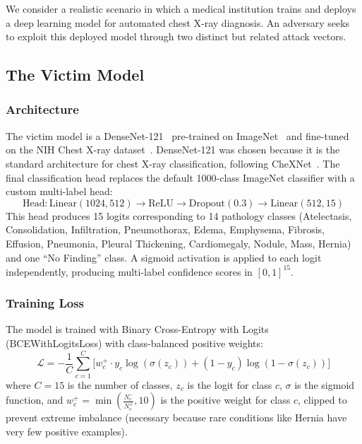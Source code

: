 \documentclass[conference]{IEEEtran}
\begin{document}
We consider a realistic scenario in which a medical institution trains and deploys a deep learning model for automated chest X-ray diagnosis. An adversary seeks to exploit this deployed model through two distinct but related attack vectors.

\subsection{The Victim Model}

\subsubsection{Architecture}
The victim model is a DenseNet-121~\cite{huang2017densely} pre-trained on ImageNet~\cite{deng2009imagenet} and fine-tuned on the NIH Chest X-ray dataset~\cite{wang2017chestxray}. DenseNet-121 was chosen because it is the standard architecture for chest X-ray classification, following CheXNet~\cite{rajpurkar2017chexnet}. The final classification head replaces the default 1000-class ImageNet classifier with a custom multi-label head:
\begin{equation}
    \text{Head}: \text{Linear}(1024, 512) \rightarrow \text{ReLU} \rightarrow \text{Dropout}(0.3) \rightarrow \text{Linear}(512, 15)
\end{equation}
This head produces 15 logits corresponding to 14 pathology classes (Atelectasis, Consolidation, Infiltration, Pneumothorax, Edema, Emphysema, Fibrosis, Effusion, Pneumonia, Pleural Thickening, Cardiomegaly, Nodule, Mass, Hernia) and one ``No Finding'' class. A sigmoid activation is applied to each logit independently, producing multi-label confidence scores in $[0, 1]^{15}$.

\subsubsection{Training Loss}
The model is trained with Binary Cross-Entropy with Logits (BCEWithLogitsLoss) with class-balanced positive weights:
\begin{equation}
    \mathcal{L} = -\frac{1}{C} \sum_{c=1}^{C} \Big[ w_c^+ \cdot y_c \log(\sigma(z_c)) + (1 - y_c) \log(1 - \sigma(z_c)) \Big]
\end{equation}
where $C = 15$ is the number of classes, $z_c$ is the logit for class $c$, $\sigma$ is the sigmoid function, and $w_c^+ = \min\left(\frac{N_c^-}{N_c^+}, 10\right)$ is the positive weight for class $c$, clipped to prevent extreme imbalance (necessary because rare conditions like Hernia have very few positive examples).
\end{document}
